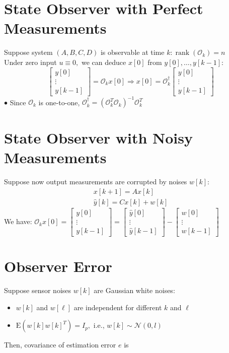\documentclass[10pt,a4paper,oneside]{article}
\begin{document}
\section{State Observer with Perfect Measurements}
Suppose system $(A, B, C, D)$ is observable at time $k : \operatorname{rank}\left(\mathcal{O}_{k}\right)=n$\\
Under zero input $u \equiv 0,$ we can deduce $x[0]$ from $y[0], \ldots, y[k-1]$:
\[
\left[\begin{array}{c}{y[0]} \\ {\vdots} \\ {y[k-1]}\end{array}\right]=\mathcal{O}_{k}x[0] \Rightarrow x[0]=\mathcal{O}_{k}^{\dagger}\left[\begin{array}{c}{y[0]} \\ {\vdots} \\ {y[k-1]}\end{array}\right]
\]
$\bullet$ Since $\mathcal{O}_{k}$ is one-to-one, $\mathcal{O}_{k}^{\dagger}=\left(\mathcal{O}_{k}^{T} \mathcal{O}_{k}\right)^{-1} \mathcal{O}_{k}^{T}$
\section{State Observer with Noisy Measurements}
Suppose now output measurements are corrupted by noises $w[k]$:
\[
\begin{array}{l}{x[k+1]=A x[k]} \\ {\hat{y}[k]=C x[k]+w[k]}\end{array}
\]
We have: $\mathcal{O}_{k}x[0]=\left[\begin{array}{c}{y[0]} \\ {\vdots} \\ {y[k-1]}\end{array}\right]=\left[\begin{array}{c}{\hat{y}[0]} \\ {\vdots} \\ {\hat{y}[k-1]}\end{array}\right]-\left[\begin{array}{c}{w[0]} \\ {\vdots} \\ {w[k-1]}\end{array}\right]$
\section{Observer Error}
Suppose sensor noises $w[k]$ are Gaussian white noises:
\begin{itemize}
\item $w[k]$ and $w[\ell]$ are independent for different $k$ and $\ell$
\item $\mathrm{E}\left(w[k] w[k]^{T}\right)=I_{p},$ i.e., $w[k] \sim \mathcal{N}(0, l)$
\end{itemize}
Then, covariance of estimation error $e$ is
\end{document}
